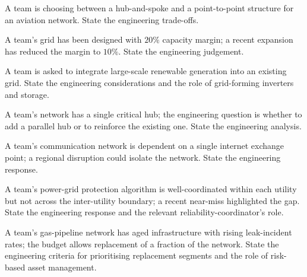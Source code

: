 \begin{exercise}
A team is choosing between a hub-and-spoke and a point-to-point structure for an aviation network. State the engineering trade-offs.
\end{exercise}

\begin{exercise}
A team's grid has been designed with $20\%$ capacity margin; a recent expansion has reduced the margin to $10\%$. State the engineering judgement.
\end{exercise}

\begin{exercise}
A team is asked to integrate large-scale renewable generation into an existing grid. State the engineering considerations and the role of grid-forming inverters and storage.
\end{exercise}

\begin{exercise}
A team's network has a single critical hub; the engineering question is whether to add a parallel hub or to reinforce the existing one. State the engineering analysis.
\end{exercise}

\begin{exercise}
A team's communication network is dependent on a single internet exchange point; a regional disruption could isolate the network. State the engineering response.
\end{exercise}

\begin{exercise}
A team's power-grid protection algorithm is well-coordinated within each utility but not across the inter-utility boundary; a recent near-miss highlighted the gap. State the engineering response and the relevant reliability-coordinator's role.
\end{exercise}

\begin{exercise}
A team's gas-pipeline network has aged infrastructure with rising leak-incident rates; the budget allows replacement of a fraction of the network. State the engineering criteria for prioritising replacement segments and the role of risk-based asset management.
\end{exercise}

